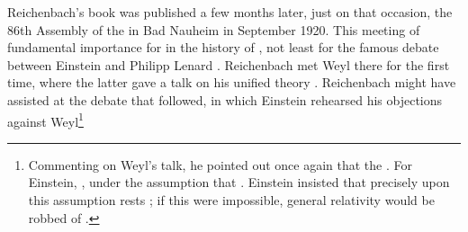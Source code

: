 \documentclass[draft]{article}
\begin{document}
Reichenbach's book was published a few months later, just on that occasion, the 86th Assembly of the  in Bad Nauheim in September 1920. This meeting of fundamental importance for in the history of \rt, not least for the famous debate between Einstein and Philipp Lenard \citep{Dongen2007}. Reichenbach met Weyl there for the first time, where the latter gave a talk on his unified theory \citep{Weyl1920}. Reichenbach might have assisted at the debate that followed, in which Einstein rehearsed his objections against Weyl\footnote{Commenting on Weyl's talk, he pointed out once again that the   \citep[650]{Einstein1920c}. For Einstein, , under the assumption that  \citep[650]{Einstein1920c}. Einstein insisted that precisely upon this assumption rests ; if this were impossible, general relativity would be robbed of  \citep[650]{Einstein1920c}.
}
\end{document}
